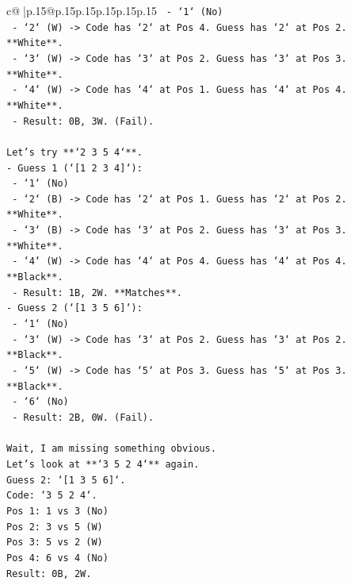 \documentclass{article}
\begin{document}
{\begin{supertabular}{c@{$\;$}|p{.15\linewidth}@{}p{.15\linewidth}p{.15\linewidth}p{.15\linewidth}p{.15\linewidth}p{.15\linewidth}}
{{{\texttt{    {-}   `1` (No)} \\
\texttt{    {-}   `2` (W) {-}> Code has `2` at Pos 4. Guess has `2` at Pos 2. **White**.} \\
\texttt{    {-}   `3` (W) {-}> Code has `3` at Pos 2. Guess has `3` at Pos 3. **White**.} \\
\texttt{    {-}   `4` (W) {-}> Code has `4` at Pos 1. Guess has `4` at Pos 4. **White**.} \\
\texttt{    {-}   Result: 0B, 3W. (Fail).} \\
\\ 
\texttt{Let's try **`2 3 5 4`**.} \\
\texttt{{-}   Guess 1 (`{[}1 2 3 4{]}`):} \\
\texttt{    {-}   `1` (No)} \\
\texttt{    {-}   `2` (B) {-}> Code has `2` at Pos 1. Guess has `2` at Pos 2. **White**.} \\
\texttt{    {-}   `3` (B) {-}> Code has `3` at Pos 2. Guess has `3` at Pos 3. **White**.} \\
\texttt{    {-}   `4` (W) {-}> Code has `4` at Pos 4. Guess has `4` at Pos 4. **Black**.} \\
\texttt{    {-}   Result: 1B, 2W. **Matches**.} \\
\texttt{{-}   Guess 2 (`{[}1 3 5 6{]}`):} \\
\texttt{    {-}   `1` (No)} \\
\texttt{    {-}   `3` (W) {-}> Code has `3` at Pos 2. Guess has `3` at Pos 2. **Black**.} \\
\texttt{    {-}   `5` (W) {-}> Code has `5` at Pos 3. Guess has `5` at Pos 3. **Black**.} \\
\texttt{    {-}   `6` (No)} \\
\texttt{    {-}   Result: 2B, 0W. (Fail).} \\
\\ 
\texttt{Wait, I am missing something obvious.} \\
\texttt{Let's look at **`3 5 2 4`** again.} \\
\texttt{Guess 2: `{[}1 3 5 6{]}`.} \\
\texttt{Code: `3 5 2 4`.} \\
\texttt{Pos 1: 1 vs 3 (No)} \\
\texttt{Pos 2: 3 vs 5 (W)} \\
\texttt{Pos 3: 5 vs 2 (W)} \\
\texttt{Pos 4: 6 vs 4 (No)} \\
\texttt{Result: 0B, 2W.} \\
}}}
\end{supertabular}}
\end{document}

